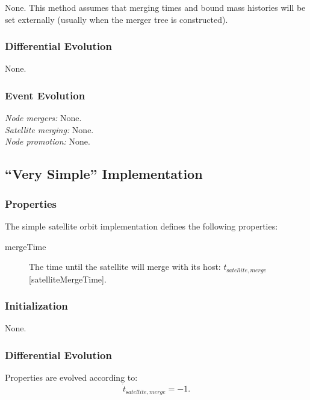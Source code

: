 None. This method assumes that merging times and bound mass histories will be set externally (usually when the merger tree is constructed).

\subsubsection{Differential Evolution}

None.

\subsubsection{Event Evolution}

\noindent\emph{Node mergers:} None.\\

\noindent\emph{Satellite merging:} None.\\

\noindent\emph{Node promotion:} None.\\

\subsection{``Very Simple'' Implementation}

\subsubsection{Properties}

The simple satellite orbit implementation defines the following properties:
\begin{description}
 \item [{\normalfont \ttfamily mergeTime}] The time until the satellite will merge with its host: $t_{\mathrm satellite, merge}$ [{\normalfont \ttfamily satelliteMergeTime}].
\end{description}

\subsubsection{Initialization}

None.

\subsubsection{Differential Evolution}

Properties are evolved according to:
\begin{equation}
 \dot{t}_{\mathrm satellite, merge} = -1.
\end{equation}


